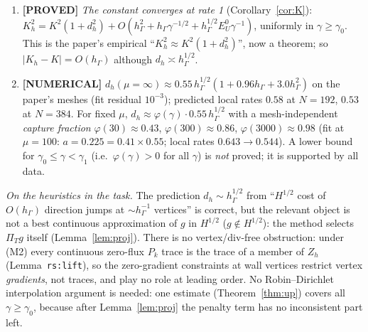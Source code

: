 \documentclass[11pt]{article}
\theoremstyle{remark}
\newcommand{\hG}{h_\Gamma}
\newcommand{\Zh}{Z_h}
\newcommand{\PT}{\Pi_T}
\newcommand{\EU}{E^{0}_{U}}
\newcommand{\lab}[1]{\textbf{[#1]}}
\begin{document}
\begin{enumerate}[label=(\alph*)]
\item \lab{PROVED} \emph{The constant converges at rate 1} (Corollary~\ref{cor:K}): $K_h^2=K^2(1+d_h^2)+O(\hG^2+\hG\gamma^{-1/2}+\hG^{1/2}\EU\gamma^{-1})$, uniformly in $\gamma\ge\gamma_0$. This is the paper's empirical ``$K_h^2\approx K^2(1+d_h^2)$'', now a theorem; so $|K_h-K|=O(\hG)$ although $d_h\asymp\hG^{1/2}$.
\item \lab{NUMERICAL} $d_h(\mu{=}\infty)\approx0.55\,\hG^{1/2}(1+0.96\hG+3.0\hG^2)$ on the paper's meshes (fit residual $10^{-3}$); predicted local rates $0.58$ at $N=192$, $0.53$ at $N=384$. For fixed $\mu$, $d_h\approx\varphi(\gamma)\cdot0.55\,\hG^{1/2}$ with a mesh-independent \emph{capture fraction} $\varphi(30)\approx0.43$, $\varphi(300)\approx0.86$, $\varphi(3000)\approx0.98$ (fit at $\mu=100$: $a=0.225=0.41\times0.55$; local rates $0.643\to0.544$). A lower bound for $\gamma_0\le\gamma<\gamma_1$ (i.e.\ $\varphi(\gamma)>0$ for all $\gamma$) is \emph{not} proved; it is supported by all data.
\end{enumerate}

\emph{On the heuristics in the task.} The prediction $d_h\sim\hG^{1/2}$ from ``$H^{1/2}$ cost of $O(\hG)$ direction jumps at $\sim\hG^{-1}$ vertices'' is correct, but the relevant object is not a best continuous approximation of $g$ in $H^{1/2}$ ($g\notin H^{1/2}$): the method selects $\PT g$ itself (Lemma~\ref{lem:proj}). There is no vertex/div-free obstruction: under (M2) every continuous zero-flux $P_k$ trace is the trace of a member of $\Zh$ (Lemma~\texttt{rs:lift}), so the zero-gradient constraints at wall vertices restrict vertex \emph{gradients}, not traces, and play no role at leading order. No Robin--Dirichlet interpolation argument is needed: one estimate (Theorem~\ref{thm:up}) covers all $\gamma\ge\gamma_0$, because after Lemma~\ref{lem:proj} the penalty term has no inconsistent part left.
\end{document}
